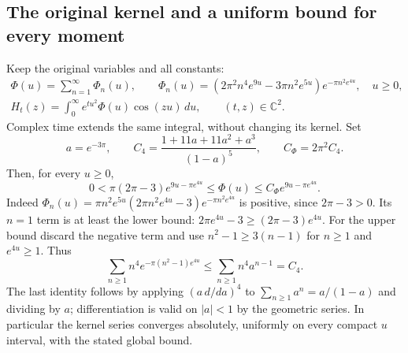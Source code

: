 \subsection{The original kernel and a uniform bound for every moment}

Keep the original variables and all constants:
\begin{equation}\tag{THS1}
\begin{gathered}
 \Phi(u)=\sum_{n=1}^{\infty}\Phi_n(u),\qquad
 \Phi_n(u)=(2\pi^2n^4e^{9u}-3\pi n^2e^{5u})e^{-\pi n^2e^{4u}},
 \quad u\ge0,\\
 H_t(z)=\int_0^\infty e^{tu^2}\Phi(u)\cos(zu)\,du,
 \qquad (t,z)\in\mathbb C^2.
\end{gathered}
\end{equation}
Complex time extends the same integral, without changing its kernel.
Set
\begin{equation}\tag{THS2}
 a=e^{-3\pi},\qquad
 C_4=\frac{1+11a+11a^2+a^3}{(1-a)^5},\qquad C_\Phi=2\pi^2C_4.
\end{equation}
Then, for every $u\ge0$,
\begin{equation}\tag{THS3}
 0<\pi(2\pi-3)e^{9u-\pi e^{4u}}
       \le\Phi(u)\le C_\Phi e^{9u-\pi e^{4u}}.
\end{equation}
Indeed
$\Phi_n(u)=\pi n^2e^{5u}(2\pi n^2e^{4u}-3)e^{-\pi n^2e^{4u}}$
is positive, since $2\pi-3>0$. Its $n=1$ term is at least the
lower bound: $2\pi e^{4u}-3\ge(2\pi-3)e^{4u}$.
For the upper bound discard the negative term and use
$n^2-1\ge3(n-1)$ for $n\ge1$ and $e^{4u}\ge1$. Thus
\[
 \sum_{n\ge1}n^4e^{-\pi(n^2-1)e^{4u}}
 \le\sum_{n\ge1}n^4a^{n-1}=C_4.
\]
The last identity follows by applying $(a\,d/da)^4$ to
$\sum_{n\ge1}a^n=a/(1-a)$ and dividing by $a$; differentiation
is valid on $|a|<1$ by the geometric series. In particular the
kernel series converges absolutely, uniformly on every compact
$u$ interval, with the stated global bound.

